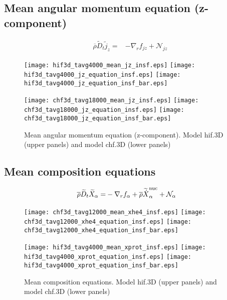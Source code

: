 \documentclass[10pt,paper=a4]{report}
\newcommand{\eht}{\overline}
\newcommand{\fav}{\widetilde}
\newcommand{\av}{\overline}
\def\erho{\eht{\rho}}
\begin{document}
\newpage

\subsection{Mean angular momentum equation (z-component)}

\begin{align}
\erho\fav{D}_t \fav{j}_z = & -\nabla_r f_{jz} + {\mathcal N_{jz}} 
\end{align}

\begin{figure}[!h]
\centerline{
\texttt{[image: hif3d\_tavg4000\_mean\_jz\_insf.eps]}
\texttt{[image: hif3d\_tavg4000\_jz\_equation\_insf.eps]}
\texttt{[image: hif3d\_tavg4000\_jz\_equation\_insf\_bar.eps]}}

\centerline{
\texttt{[image: chf3d\_tavg18000\_mean\_jz\_insf.eps]}
\texttt{[image: chf3d\_tavg18000\_jz\_equation\_insf.eps]}
\texttt{[image: chf3d\_tavg18000\_jz\_equation\_insf\_bar.eps]}}

\caption{Mean angular momentum equation (z-component). Model {\sf hif.3D} (upper panels) and model {\sf chf.3D} (lower panels)}
\end{figure}


\newpage

\subsection{Mean composition equations}

\begin{align}
\erho\fav{D}_t \fav{X}_\alpha = & -\nabla_r f_\alpha + \av{\rho}\fav{\dot{X}}_\alpha^{\rm nuc} + {\mathcal N_\alpha} 
\end{align}

\begin{figure}[!h]
\centerline{
\texttt{[image: chf3d\_tavg12000\_mean\_xhe4\_insf.eps]}
\texttt{[image: chf3d\_tavg12000\_xhe4\_equation\_insf.eps]}
\texttt{[image: chf3d\_tavg12000\_xhe4\_equation\_insf\_bar.eps]}}

\centerline{
\texttt{[image: hif3d\_tavg4000\_mean\_xprot\_insf.eps]}
\texttt{[image: hif3d\_tavg4000\_xprot\_equation\_insf.eps]}
\texttt{[image: hif3d\_tavg4000\_xprot\_equation\_insf\_bar.eps]}}
\caption{Mean composition equations. Model {\sf hif.3D} (upper panels) and model {\sf chf.3D} (lower panels)}
\end{figure}
\end{document}

